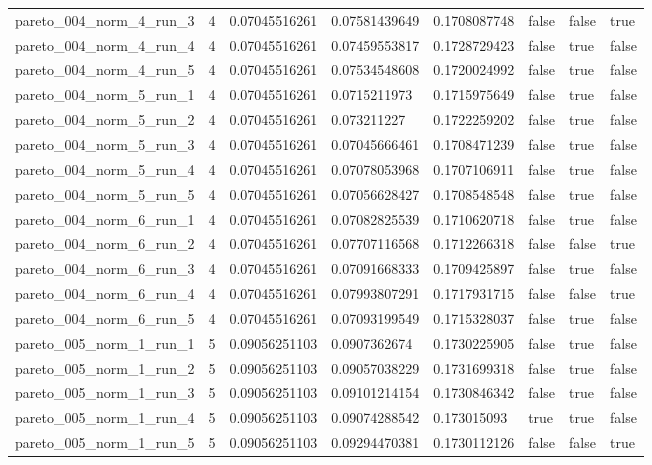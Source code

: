 \begin{tabular}{@{}llllllll@{}}
pareto\_004\_norm\_4\_run\_3 & 4 & 0.07045516261 & 0.07581439649 & 0.1708087748 & false & false & true \\
pareto\_004\_norm\_4\_run\_4 & 4 & 0.07045516261 & 0.07459553817 & 0.1728729423 & false & true & false \\
pareto\_004\_norm\_4\_run\_5 & 4 & 0.07045516261 & 0.07534548608 & 0.1720024992 & false & true & false \\
pareto\_004\_norm\_5\_run\_1 & 4 & 0.07045516261 & 0.0715211973 & 0.1715975649 & false & true & false \\
pareto\_004\_norm\_5\_run\_2 & 4 & 0.07045516261 & 0.073211227 & 0.1722259202 & false & true & false \\
pareto\_004\_norm\_5\_run\_3 & 4 & 0.07045516261 & 0.07045666461 & 0.1708471239 & false & true & false \\
pareto\_004\_norm\_5\_run\_4 & 4 & 0.07045516261 & 0.07078053968 & 0.1707106911 & false & true & false \\
pareto\_004\_norm\_5\_run\_5 & 4 & 0.07045516261 & 0.07056628427 & 0.1708548548 & false & true & false \\
pareto\_004\_norm\_6\_run\_1 & 4 & 0.07045516261 & 0.07082825539 & 0.1710620718 & false & true & false \\
pareto\_004\_norm\_6\_run\_2 & 4 & 0.07045516261 & 0.07707116568 & 0.1712266318 & false & false & true \\
pareto\_004\_norm\_6\_run\_3 & 4 & 0.07045516261 & 0.07091668333 & 0.1709425897 & false & true & false \\
pareto\_004\_norm\_6\_run\_4 & 4 & 0.07045516261 & 0.07993807291 & 0.1717931715 & false & false & true \\
pareto\_004\_norm\_6\_run\_5 & 4 & 0.07045516261 & 0.07093199549 & 0.1715328037 & false & true & false \\
pareto\_005\_norm\_1\_run\_1 & 5 & 0.09056251103 & 0.0907362674 & 0.1730225905 & false & true & false \\
pareto\_005\_norm\_1\_run\_2 & 5 & 0.09056251103 & 0.09057038229 & 0.1731699318 & false & true & false \\
pareto\_005\_norm\_1\_run\_3 & 5 & 0.09056251103 & 0.09101214154 & 0.1730846342 & false & true & false \\
pareto\_005\_norm\_1\_run\_4 & 5 & 0.09056251103 & 0.09074288542 & 0.173015093 & true & true & false \\
pareto\_005\_norm\_1\_run\_5 & 5 & 0.09056251103 & 0.09294470381 & 0.1730112126 & false & false & true \\

\end{tabular}

